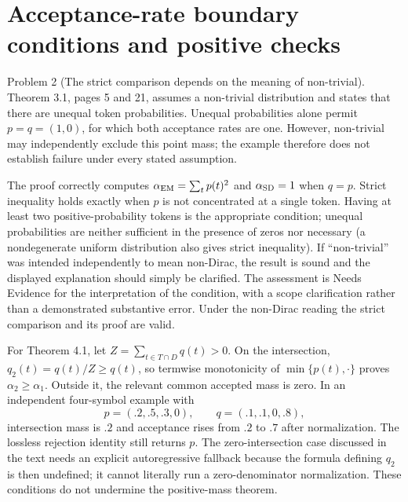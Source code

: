 \documentclass[10pt]{article}
\begin{document}
\section*{Acceptance-rate boundary conditions and positive checks}
Problem 2 (The strict comparison depends on the meaning of non-trivial).  Theorem 3.1, pages 5 and 21, assumes a non-trivial distribution and states that there are unequal token probabilities. Unequal probabilities alone permit \(p=q=(1,0)\), for which both acceptance rates are one. However, non-trivial may independently exclude this point mass; the example therefore does not establish failure under every stated assumption.\par
The proof correctly computes \(\alpha_{\rm EM}=\sum_t p(t)^2\) and \(\alpha_{\rm SD}=1\) when \(q=p\). Strict inequality holds exactly when \(p\) is not concentrated at a single token. Having at least two positive-probability tokens is the appropriate condition; unequal probabilities are neither sufficient in the presence of zeros nor necessary (a nondegenerate uniform distribution also gives strict inequality). If “non-trivial” was intended independently to mean non-Dirac, the result is sound and the displayed explanation should simply be clarified. The assessment is Needs Evidence for the interpretation of the condition, with a scope clarification rather than a demonstrated substantive error. Under the non-Dirac reading the strict comparison and its proof are valid.\par
For Theorem 4.1, let \(Z=\sum_{t\in T\cap D}q(t)>0\). On the intersection, \(q_2(t)=q(t)/Z\geq q(t)\), so termwise monotonicity of \(\min\{p(t),\cdot\}\) proves \(\alpha_2\geq\alpha_1\). Outside it, the relevant common accepted mass is zero. In an independent four-symbol example with \[p=(.2,.5,.3,0),\qquad q=(.1,.1,0,.8),\] intersection mass is \(.2\) and acceptance rises from \(.2\) to \(.7\) after normalization. The lossless rejection identity still returns \(p\). The zero-intersection case discussed in the text needs an explicit autoregressive fallback because the formula defining \(q_2\) is then undefined; it cannot literally run a zero-denominator normalization. These conditions do not undermine the positive-mass theorem.\par
\end{document}
